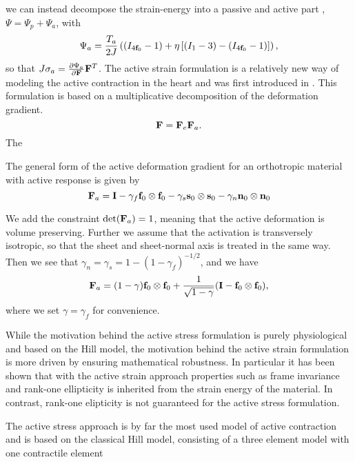 we can instead decompose the strain-energy into a passive and active
part \cite{pathmanathan2010cardiac}, $\Psi= \Psi_p + \Psi_a$, with
\begin{align}
\Psi_a = \frac{T_a}{2J} \left(( I_{4\mathbf{f}_0} - 1)  + \eta \left[ (I_1 - 3) -
    (I_{4\mathbf{f}_0} - 1)\right] \right), 
\end{align}
so that $J \mathbf{\sigma}_a  = \frac{\partial \Psi_a}{\partial \mathbf{F}} \mathbf{F}^{T}$.
The active strain formulation is a relatively new way of modeling the
active contraction in the heart and was first introduced in
\cite{taber2000modeling}. This formulation is based on a
multiplicative decomposition of the deformation gradient.  
\begin{equation}
 \mathbf{F} = \mathbf{F}_e \mathbf{F}_a.
\label{eq:active_strain}
\end{equation}
The 

The general form of the active deformation gradient for an orthotropic
material with active response is given by
\begin{equation}
  \mathbf{F}_a =  \mathbf{I}
  - \gamma_f \mathbf{f}_0 \otimes \mathbf{f}_0
  - \gamma_s \mathbf{s}_0 \otimes \mathbf{s}_0
  - \gamma_n \mathbf{n}_0\otimes \mathbf{n}_0
 \label{eq:active_strain_Fa_general}
\end{equation}

We add the constraint $\det(\mathbf{F}_a) = 1$, meaning that the active
deformation is volume preserving. Further we assume that the activation is
transversely isotropic, so that the sheet and sheet-normal axis is
treated in the same way. Then  we see that $\gamma_n = \gamma_s =1-
(1-\gamma_f)^{-1/2}$, and we have
\begin{equation}
  \mathbf{F}_a = (1 - \gamma) \mathbf{f}_0 \otimes \mathbf{f}_0  + \frac{1}{\sqrt{1 - \gamma}} (\mathbf{I} - \mathbf{f}_0 \otimes \mathbf{f}_0), 
 \label{eq:active_strain_Fa_gjerald}
\end{equation}
where we set $\gamma = \gamma_f$ for convenience. 


While the motivation behind the active stress formulation is purely
physiological and based on the Hill model, the motivation behind the
active strain formulation is more driven by ensuring mathematical
robustness. In particular it has been shown \cite{ambrosi2012active}
that with the active strain approach properties such as frame
invariance and rank-one ellipticity is inherited from the strain
energy of the material. In contrast, rank-one elipticity is not
guaranteed for the active stress formulation.

The active stress approach is by far the most used model of active
contraction and is based on the classical Hill model, consisting of a
three element model with one contractile element 

